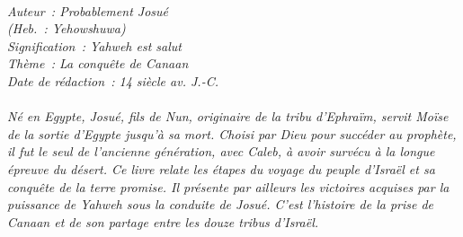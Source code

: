 \BFont
\noindent\hrulefill
{\footnotesize
\textit{
\bigskip
{\centering{}
\\Auteur~: Probablement Josué
\\(Heb.~: Yehowshuwa)
\\Signification~: Yahweh est salut
\\Thème~: La conquête de Canaan
\\Date de rédaction~: 14 siècle av. J.-C.\\}
}
\textit{
\\Né en Egypte, Josué, fils de Nun, originaire de la tribu d'Ephraïm, servit Moïse de la sortie d'Egypte jusqu'à sa mort. Choisi par Dieu pour succéder au prophète, il fut le seul de l'ancienne génération, avec Caleb, à avoir survécu à la longue épreuve du désert. Ce livre relate les étapes du voyage du peuple d'Israël et sa conquête de la terre promise. Il présente par ailleurs les victoires acquises par la puissance de Yahweh sous la conduite de Josué. C'est l'histoire de la prise de Canaan et de son partage entre les douze tribus d'Israël.\bigskip
}
}
\par\nobreak\noindent\hrulefill
